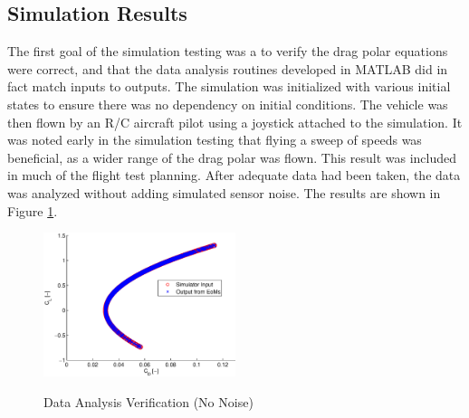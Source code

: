 \subsection*{Simulation Results}
The first goal of the simulation testing was a to verify the drag polar equations were correct, and that the data analysis routines developed in MATLAB did in fact match inputs to outputs. The simulation was initialized with various initial states to ensure there was no dependency on initial conditions. The vehicle was then flown by an R/C aircraft pilot using a joystick attached to the simulation. It was noted early in the simulation testing that flying a sweep of speeds was beneficial, as a wider range of the drag polar was flown. This result was included in much of the flight test planning. After adequate data had been taken, the data was analyzed without adding simulated sensor noise. The results are shown in Figure \ref{dragPolarNoNoise}.

\begin{figure}[H]
  \centering
  
    \includegraphics[width=0.5\textwidth]{figures/dragPolarNoNoise.eps}
    \label{dragPolarNoNoise}
    \caption{Data Analysis Verification (No Noise)} 
\end{figure}

